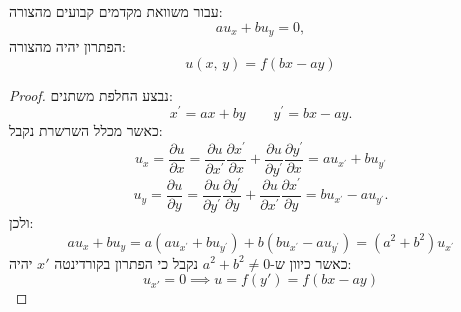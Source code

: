 \documentclass{tstextbook}
\begin{document}
\begin{proposition}
עבור משוואת מקדמים קבועים מהצורה:
$$a u_{x}+b u_{y}=0,$$
הפתרון יהיה מהצורה:
$$u(x,\,y)=f(b x-a y)$$

\end{proposition}
\begin{proof}
נבצע החלפת משתנים:
$$x^{\prime}=a x+b y\qquad y^{\prime}=b x-a y.$$
כאשר מכלל השרשרת נקבל:
$$u_{x}={\frac{\partial u}{\partial x}}={\frac{\partial u}{\partial x^{\prime}}}{\frac{\partial x^{\prime}}{\partial x}}+{\frac{\partial u}{\partial y^{\prime}}}{\frac{\partial y^{\prime}}{\partial x}}=a u_{x^{\prime}}+b u_{y^{\prime}}$$$$u_{y}={\frac{\partial u}{\partial y}}={\frac{\partial u}{\partial y^{\prime}}}{\frac{\partial y^{\prime}}{\partial y}}+{\frac{\partial u}{\partial x^{\prime}}}{\frac{\partial x^{\prime}}{\partial y}}=b u_{x^{\prime}}-a u_{y^{\prime}}.$$
ולכן:
$$a u_{x}+b u_{y}=a(a u_{x^{\prime}}+b u_{y^{\prime}})+b(b u_{x^{\prime}}-a u_{y^{\prime}})=(a^{2}+b^{2})u_{x^{\prime}}$$
כאשר כיוון ש-\(a^{2}+b^{2}\neq 0\) נקבל כי הפתרון בקורדינטה \(x'\) יהיה:
$$u_{x'}=0\implies u=f(y')=f(bx-ay)$$

\end{proof}
\end{document}
